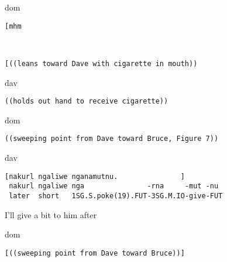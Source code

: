\documentclass[output=paper,nonflat,colorlinks,citecolor=brown]{langsci/langscibook}
\begin{document}
\vspace{2mm}
%
\begin{transbox}{1}{dom}
\begin{verbatim}
[mhm
\end{verbatim}
\end{transbox}
%
\begin{transbox}{2}{~}
\begin{verbatim}
[((leans toward Dave with cigarette in mouth))
\end{verbatim}
\end{transbox}
%
\begin{mdframednoverticalspace}[style=firstfoc]
\begin{transbox}{3}{dav}
\begin{verbatim}
((holds out hand to receive cigarette))
\end{verbatim}
\end{transbox}
\end{mdframednoverticalspace}
%
\begin{mdframednoverticalspace}[style=thirdfoc]
\begin{transbox}{4}{dom}
\begin{verbatim}
((sweeping point from Dave toward Bruce, Figure 7))
\end{verbatim}
\end{transbox}
\end{mdframednoverticalspace}\vspace{-1mm}
%
\begin{mdframednoverticalspace}[style=secondfoc]
\begin{transbox}{5}{dav}
\begin{verbatim}
[nakurl ngaliwe nganamutnu.               ]
 nakurl ngaliwe nga               -rna     -mut -nu
 later  short   1SG.S.poke(19).FUT-3SG.M.IO-give-FUT
\end{verbatim}
\hspace{0.07cm} I'll give a bit to him after
\end{transbox}
\end{mdframednoverticalspace}
\begin{mdframednoverticalspace}[style=thirdfoc]
\begin{transbox}{6}{dom}
\begin{verbatim}
[((sweeping point from Dave toward Bruce))]
\end{verbatim}
\end{transbox}
\end{mdframednoverticalspace}
\end{document}
